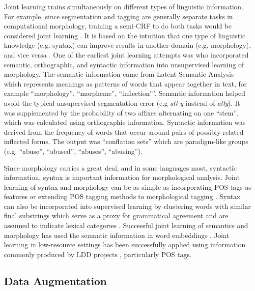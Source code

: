 \documentclass[12pt]{article}
\begin{document}
Joint learning trains simultaneously on different types of linguistic information. For example, since segmentation and tagging are generally separate tasks in computational morphology, training a semi-CRF to do both tasks would be considered joint learning \cite{cotterell_labeled_2015}. It is based on the intuition that one type of linguistic knowledge (e.g. syntax) can improve results in another domain (e.g. morphology), and vice versa \cite{goldsmith_computational_2017}. One of the earliest joint learning attempts was  who incorporated semantic, orthographic, and syntactic information into unsupervised learning of morphology. The semantic information came from Latent Semantic Analysis which represents meanings as patterns of words that appear together in text, for example ``morphology'', ``morpheme'', ``inflection'''. Semantic information helped avoid the typical unsupervised segmentation error (e.g \textit{all-y} instead of \textit{ally}). It was supplemented by the probability of two affixes alternating on one ``stem'', which was calculated using orthographic information. Syntactic information was derived from the frequency of words that occur around pairs of possibly related inflected forms. The output was ``conflation sets'' which are paradigm-like groups (e.g. ``abuse'', ``abused'', ``abuses'', ``abusing'').
 
Since morphology carries a great deal, and in some languages most, syntactic information, syntax is important information for morphological analysis. Joint learning of syntax and morphology can be as simple as incorporating POS tags as features or extending POS tagging methods to morphological tagging \cite{buys_cross-lingual_2016,cotterell_cross-lingual_2017}. Syntax can also be incorporated into supervised learning by clustering words with similar final substrings which serve as a proxy for grammatical agreement and are assumed to indicate lexical categories \cite{lee_modeling_2011}. Successful joint learning of semantics and morphology has used the semantic information in word embeddings \cite{soricut_unsupervised_2015}. Joint learning in low-resource settings has been successfully applied using information commonly produced by LDD projects \cite{palmer_semi-automated_2009,moeller_automatic_2018}, particularly POS tags.

\subsection{Data Augmentation}
\label{augment}
\end{document}
